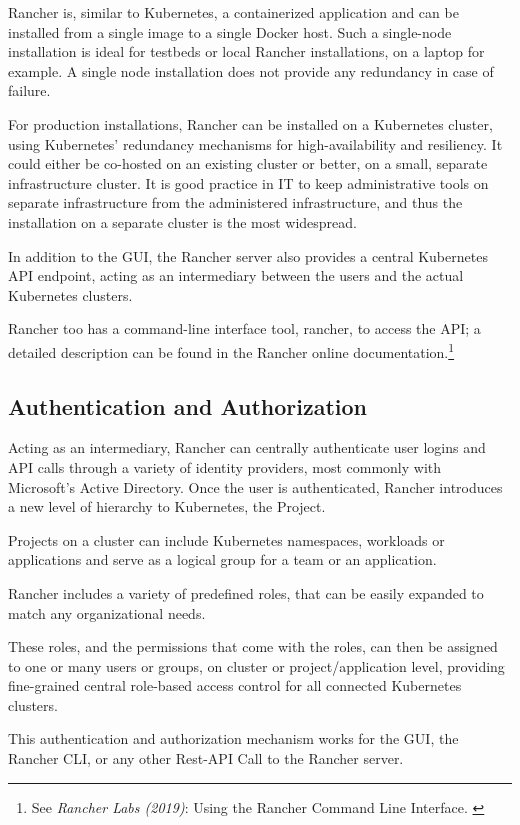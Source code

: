 Rancher is, similar to Kubernetes, a containerized application and can be installed from a single image to a single Docker host. Such a single-node installation is ideal for testbeds or local Rancher installations, on a laptop for example. A single node installation does not provide any redundancy in case of failure.

For production installations, Rancher can be installed on a Kubernetes cluster, using Kubernetes' redundancy mechanisms for high-availability and resiliency. It could either be co-hosted on an existing cluster or better, on a small, separate infrastructure cluster. It is good practice in IT to keep administrative tools on separate infrastructure from the administered infrastructure, and thus the installation on a separate cluster is the most widespread.

In addition to the GUI, the Rancher server also provides a central Kubernetes API endpoint, acting as an intermediary between the users and the actual Kubernetes clusters.

Rancher too has a command-line interface tool, rancher, to access the API; a detailed description can be found in the Rancher online documentation.\footnote{See \textit{Rancher Labs (2019)}: Using the Rancher Command Line Interface. \cite{rancherCLI}}

\subsection{Authentication and Authorization}

Acting as an intermediary, Rancher can centrally authenticate user logins and API calls through a variety of identity providers, most commonly with Microsoft's Active Directory. Once the user is authenticated, Rancher introduces a new level of hierarchy to Kubernetes, the Project.

Projects on a cluster can include Kubernetes namespaces, workloads or applications and serve as a logical group for a team or an application. 

Rancher includes a variety of predefined roles, that can be easily expanded to match any organizational needs.

These roles, and the permissions that come with the roles, can then be assigned to one or many users or groups, on cluster or project/application level, providing fine-grained central role-based access control for all connected Kubernetes clusters.

This authentication and authorization mechanism works for the GUI, the Rancher CLI, or any other Rest-API Call to the Rancher server.

